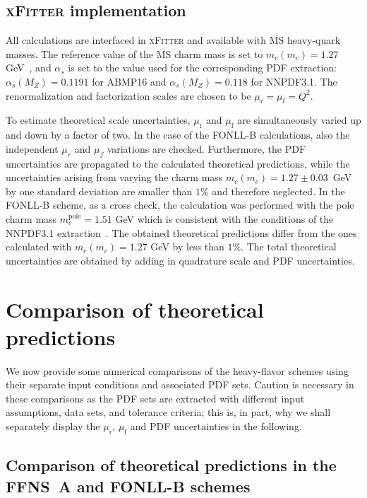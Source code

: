\documentclass[pdftex,twocolumn,epjc3]{svjour3}          %
\newcommand{\abmp} {ABMP16\xspace}
\newcommand{\nnpdf} {NNPDF3.1\xspace}
\newcommand{\xfitter} {\textsc{xFitter}\xspace}
\newcommand{\fonll} {{FONLL-B}\xspace}
\newcommand{\ffns} {{FFNS~A}\xspace}
\begin{document}
\subsection{\xfitter implementation}

All calculations are interfaced in \xfitter and available with
$\overline{\mbox{MS}}$ heavy-quark masses. The reference value of the
$\overline{\mbox{MS}}$ charm mass is set to $m_c(m_c) = 1.27$
GeV~\cite{Tanabashi:2018oca}, and $\alpha_s$ is set to the value used
for the corresponding PDF extraction: $\alpha_s(M_Z) = 0.1191$ for
\abmp and $\alpha_s(M_Z) = 0.118$ for \nnpdf.  The renormalization and
factorization scales are chosen to be
$\mu_\mathrm{r} = \mu_\mathrm{f} = Q^2$.

To estimate theoretical scale uncertainties, $\mu_\mathrm{r}$ and
$\mu_\mathrm{f}$ are simultaneously varied up and down by a factor of 
two. In the case of the \fonll calculations, also the independent
$\mu_r$ and $\mu_f$ variations are checked. Furthermore, the PDF
uncertainties are propagated to the calculated theoretical
predictions, while the uncertainties arising from varying the charm
mass $m_c(m_c) = 1.27 \pm 0.03$~GeV by one standard deviation are
smaller than $1\%$ and therefore neglected. In the \fonll scheme, as a
cross check, the calculation was performed with the pole charm mass
$m_c^{\text{pole}} = 1.51$ GeV which is consistent with the conditions
of the \nnpdf extraction~\cite{Ball:2017nwa}. The obtained theoretical
predictions differ from the ones calculated with $m_c(m_c) = 1.27$ GeV
by less than $1\%$. The total theoretical uncertainties are obtained
by adding in quadrature scale and PDF uncertainties.

\section{Comparison of theoretical predictions}
\label{sec:thpred-comparison}

We now provide some numerical comparisons of the heavy-flavor schemes
using their separate input conditions and associated PDF sets.
%
Caution is necessary in these comparisons as the PDF sets are
extracted with different input assumptions, data sets, and tolerance
criteria; this is, in part, why we shall separately display the
$\mu_\mathrm{r}$, $\mu_\mathrm{f}$  and PDF
uncertainties in the following.

\subsection{Comparison of theoretical predictions in the \ffns and \fonll schemes}
\label{sec:compareI}
\end{document}
